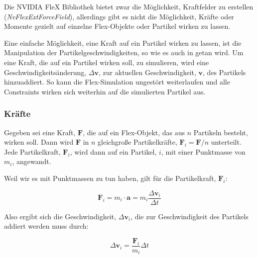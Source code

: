 
Die NVIDIA FleX Bibliothek bietet zwar die Möglichkeit, Kraftfelder zu erstellen (\textit{NvFlexExtForceField}), allerdings gibt es nicht die Möglichkeit, Kräfte oder Momente gezielt auf einzelne Flex-Objekte oder Partikel wirken zu lassen. %

Eine einfache Möglichkeit, eine Kraft auf ein Partikel wirken zu lassen, ist die Manipulation der Partikelgeschwindigkeiten, so wie es auch in \cite{PBD} getan wird. Um eine Kraft, die auf ein Partikel wirken soll, zu simulieren, wird eine Geschwindigkeitsänderung, $\Delta\textbf{v}$, zur aktuellen Geschwindigkeit, $\textbf{v}$, des Partikels hinzuaddiert. So kann die Flex-Simulation ungestört weiterlaufen und alle Constraints
wirken sich weiterhin auf die simulierten Partikel aus.

\subsubsection{Kräfte}
Gegeben sei eine Kraft, $\textbf{F}$, die auf ein Flex-Objekt, das aus $n$ Partikeln besteht, wirken soll. Dann wird $\textbf{F}$ in $n$ gleichgroße Partikelkräfte, $\textbf{F}_i = \textbf{F} / n$ unterteilt. Jede Partikelkraft, $\textbf{F}_i$, wird dann auf ein Partikel, $i$, mit einer Punktmasse von $m_i$, angewandt.

Weil wir es mit Punktmassen zu tun haben, gilt für die Partikelkraft, $\textbf{F}_i$:

\begin{equation}
\textbf{F}_i = m_i \cdot \textbf{a} = m_i \dfrac{\Delta \textbf{v}_i}{\Delta t}
\label{form_F}
\end{equation}

Also ergibt sich die Geschwindigkeit, $\Delta \textbf{v}_i$, die zur Geschwindigkeit des Partikels addiert werden muss durch:

\begin{equation}
\Delta \textbf{v}_i = \dfrac{\textbf{F}_i}{m_i}\Delta t
\label{form_dv}
\end{equation}

